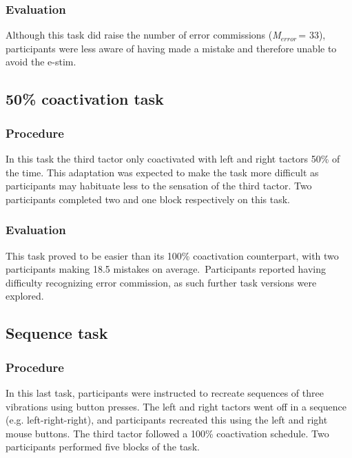 \documentclass[twocolumn, serif, authordate, review]{jote-article}
\begin{document}
\subsubsection*{Evaluation}Although this task did raise the number of error commissions (\textit{M${}_{error\ }$}= 33), participants were less aware of having made a mistake and therefore unable to avoid the e-stim.~

{}
\subsection*{50\% coactivation task}
\gotoreview
\label{sec:co50}
\subsubsection*{Procedure}In this task the third tactor only coactivated with left and right tactors 50\% of the time. This adaptation was expected to make the task more difficult as participants may habituate less to the sensation of the third tactor. Two participants completed two and one block respectively on this task.

\subsubsection*{Evaluation}This task proved to be easier than its 100\% coactivation counterpart, with two participants making 18.5 mistakes on average.~Participants reported having difficulty recognizing error commission, as such further task versions were explored.

{}
\subsection*{Sequence task} 
\gotoreview
\label{sec:sequence}
\subsubsection*{Procedure}In this last task, participants were instructed to recreate sequences of three vibrations using button presses. The left and right tactors went off in a sequence (e.g. left-right-right), and participants recreated this using the left and right mouse buttons. The third tactor followed a 100\% coactivation schedule. Two participants performed five blocks of the task.~
\end{document}
